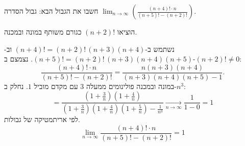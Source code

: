 
\begin{question}
חשבו את הגבול הבא:
גבול הסדרה $\displaystyle\lim_{n\to\infty}\left(\frac{(n+4)!\cdot n}{(n+5)!-(n+2)!}\right)$.
\end{question}

\begin{hint}
הוציאו $(n+2)!$ כגורם משותף במונה ובמכנה.
\end{hint}

\begin{solution}
נשתמש ב-$(n+4)!=(n+2)!\,(n+3)(n+4)$ וב-$(n+5)!=(n+2)!\,(n+3)(n+4)(n+5)$. נצמצם ב-$(n+2)!\neq0$:
\[ \frac{(n+4)!\cdot n}{(n+5)!-(n+2)!}=\frac{n(n+3)(n+4)}{(n+3)(n+4)(n+5)-1}. \]
במונה ובמכנה פולינומים ממעלה $3$ עם מקדם מוביל $1$. נחלק ב-$n^3$:
\[ =\frac{\left(1+\frac3n\right)\left(1+\frac4n\right)}{\left(1+\frac3n\right)\left(1+\frac4n\right)\left(1+\frac5n\right)-\frac1{n^3}}\xrightarrow[n\to\infty]{}\frac{1}{1-0}=1 \]
לפי אריתמטיקה של גבולות.
\[ \boxed{\lim_{n\to\infty}\frac{(n+4)!\cdot n}{(n+5)!-(n+2)!}=1} \]
\end{solution}

